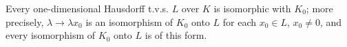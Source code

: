 Every one-dimensional Hausdorff t.v.s. $L$ over $K$ is isomorphic with $K_0$; more precisely, $\lambda \rightarrow \lambda x_0$ is an isomorphism of $K_0$ onto $L$ for each $x_0 \in L$, $x_0 \neq 0$, and every isomorphism of $K_0$ onto $L$ is of this form.
